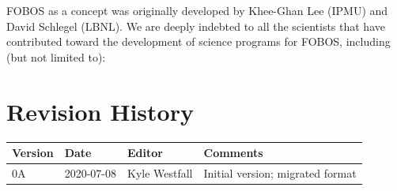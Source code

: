 \documentclass[11pt,a4paper,twoside,onecolumn,openany,final,oldfontcommands]{memoir}
\begin{document}
FOBOS as a concept was originally developed by Khee-Ghan Lee (IPMU) and David Schlegel (LBNL).  We are deeply indebted to all the scientists that have contributed toward the development of science programs for FOBOS, including (but not limited to): 

\newpage

\chapter*{Revision History}

\begin{table}[hp]{%
\begin{tabular}{l | l | l |  p{22pc}} \toprule
{\bf Version} & {\bf Date} & {\bf Editor} & {\bf Comments} \\ \midrule
0A & 2020-07-08 & Kyle Westfall & Initial version; migrated format \\ \bottomrule
\end{tabular}}
\end{table}



\end{document}
